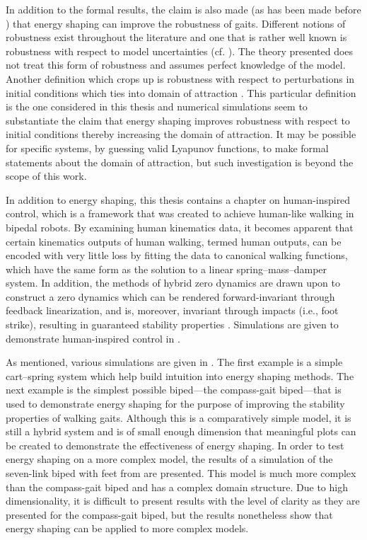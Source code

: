 In addition to the formal results, the claim is also made (as has been made
before \cite{Spong2003}) that energy shaping can improve the robustness of
gaits.
%
Different notions of robustness exist throughout the literature and one that is
rather well known is robustness with respect to model uncertainties
(cf. \cite{Freeman1996}).
%
The theory presented does not treat this form of robustness and assumes perfect
knowledge of the model.
%
Another definition which crops up is robustness with respect to perturbations in
initial conditions which ties into domain of attraction \cite{Chesi2011}.
%
This particular definition is the one considered in this thesis and numerical
simulations seem to substantiate the claim that energy shaping improves
robustness with respect to initial conditions thereby increasing the domain of
attraction.
%
It may be possible for specific systems, by guessing valid Lyapunov functions,
to make formal statements about the domain of attraction, but such investigation
is beyond the scope of this work.

In addition to energy shaping, this thesis contains a chapter on human-inspired
control, which is a framework that was created to achieve human-like walking in
bipedal robots.
%
By examining human kinematics data, it becomes apparent that certain
kinematics outputs of human walking, termed human outputs, can be encoded with
very little loss by fitting the data to canonical walking functions, which have
the same form as the solution to a linear spring--mass--damper system.
%
In addition, the methods of hybrid zero dynamics \cite{Morris2005} are drawn
upon to construct a zero dynamics which can be rendered forward-invariant
through feedback linearization, and is, moreover, invariant through impacts
(i.e., foot strike), resulting in guaranteed stability properties
\cite{Ames2012}.
%
Simulations are given to demonstrate human-inspired control in
.

As mentioned, various simulations are given in .
%
The first example is a simple cart--spring system which help build intuition
into energy shaping methods.
%
The next example is the simplest possible biped---the compass-gait
biped---that is used to demonstrate energy shaping for the purpose of improving
the stability properties of walking gaits.
%
Although this is a comparatively simple model, it is still a hybrid system and
is of small enough dimension that meaningful plots can be created to demonstrate
the effectiveness of energy shaping.
%
In order to test energy shaping on a more complex model, the results of a
simulation of the seven-link biped with feet from \cite{Grizzle2014} are
presented.
%
This model is much more complex than the compass-gait biped and has a complex
domain structure.
%
Due to high dimensionality, it is difficult to present results with the level of
clarity as they are presented for the compass-gait biped, but the results
nonetheless show that energy shaping can be applied to more complex models.
